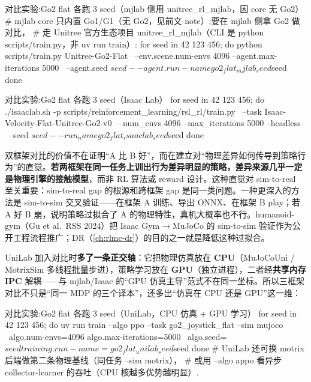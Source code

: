\begin{codebox}[bash]{对比实验:Go2 flat 各跑 3 seed（mjlab 侧用 unitree\_rl\_mjlab，因 core 无 Go2）}
# mjlab core 只内置 Go1/G1（无 Go2，见前文 note）;要在 mjlab 侧拿 Go2 做对比，
# 走 Unitree 官方生态项目 unitree_rl_mjlab（CLI 是 python scripts/train.py，非 uv run train）:
for seed in 42 123 456; do
  python scripts/train.py Unitree-Go2-Flat \
    --env.scene.num-envs 4096 --agent.max-iterations 5000 \
    --agent.seed ${seed} --agent.run-name go2_flat_mjlab_seed${seed}
done
\end{codebox}

\begin{codebox}[bash]{对比实验:Go2 flat 各跑 3 seed（Isaac Lab）}
for seed in 42 123 456; do
  ./isaaclab.sh -p scripts/reinforcement_learning/rsl_rl/train.py \
    --task Isaac-Velocity-Flat-Unitree-Go2-v0 \
    --num_envs 4096 --max_iterations 5000 --headless \
    --seed ${seed} --run_name go2_flat_isaaclab_seed${seed}
done
\end{codebox}

\begin{insight}[本质：跨框架 gap 与 sim-to-real gap 是同一类问题]\label{ins:rlmc-ql-crossgap}
双框架对比的价值不在证明“A 比 B 好”，而在建立对“物理差异如何传导到策略行为”的直觉。\textbf{若两框架在同一任务上训出行为差异明显的策略，差异来源几乎一定是物理引擎的接触模型}，而非 RL 算法或 reward 设计。这种直觉对 sim-to-real 至关重要：sim-to-real gap 的根源和跨框架 gap 是同一类问题。一种更深入的方法是 sim-to-sim 交叉验证——在框架 A 训练、导出 ONNX、在框架 B play；若 A 好 B 崩，说明策略过拟合了 A 的物理特性，真机大概率也不行。humanoid-gym（Gu et al.\ RSS 2024）把 Isaac Gym$\to$MuJoCo 的 sim-to-sim 验证作为公开工程流程推广；DR（\cref{ch:rlmc-dr}）的目的之一就是降低这种过拟合。
\end{insight}

UniLab 加入对比时\textbf{多了一条正交轴}：它把物理仿真放在 \textbf{CPU}（MuJoCoUni / MotrixSim 多线程批量步进），策略学习放在 \textbf{GPU}（独立进程），二者经\textbf{共享内存 IPC} 解耦——与 mjlab/Isaac 的“GPU 仿真主导”范式不在同一坐标。所以三框架对比不只是“同一 MDP 的三个译本”，还多出“仿真在 CPU 还是 GPU”这一维：

\begin{codebox}[bash]{对比实验:Go2 flat 各跑 3 seed（UniLab，CPU 仿真 + GPU 学习）}
for seed in 42 123 456; do
  uv run train --algo ppo --task go2_joystick_flat --sim mujoco \
    algo.num-envs=4096 algo.max-iterations=5000 \
    algo.seed=${seed} training.run-name=go2_flat_unilab_seed${seed}
done
# UniLab 还可换 motrix 后端做第二条物理基线（同任务 --sim motrix），
# 或用 --algo appo 看异步 collector-learner 的吞吐（CPU 核越多优势越明显）.
\end{codebox}

